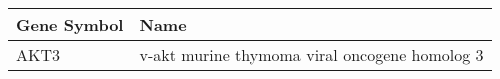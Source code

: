 \begin{tabular}{ll}
\toprule
Gene Symbol &                                          Name \\
\midrule
       AKT3 & v-akt murine thymoma viral oncogene homolog 3 \\
\bottomrule
\end{tabular}
